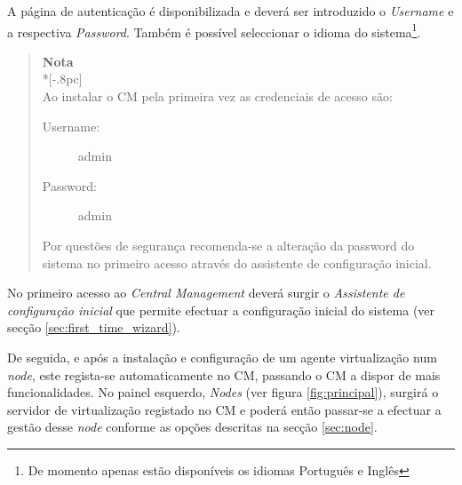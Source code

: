 

A página de autenticação é disponibilizada e deverá ser introduzido o \emph{Username} e a respectiva \emph{Password}. Também é possível seleccionar o idioma do sistema\footnote{De momento apenas estão disponíveis os idiomas Português e Inglês}.

\begin{quote}
	{\large \bf Nota} \\*[-.8pc]
	\underline{\hspace{6in}} \\
	Ao instalar o CM pela primeira vez as credenciais de acesso são:
	\begin{description}
        	\item[Username:] admin
	        \item[Password:] admin
	\end{description}
	Por questões de segurança recomenda-se a alteração da password do sistema no primeiro acesso através do assistente de configuração inicial.

\end{quote}

No primeiro acesso ao \emph{Central Management} deverá surgir o \emph{Assistente de configuração inicial} que permite efectuar a configuração inicial do sistema (ver secção \ref{sec:first_time_wizard}).

De seguida, e após a instalação e configuração de um agente virtualização num \emph{node}, este regista-se automaticamente no CM, passando o CM a dispor de mais funcionalidades.
No painel esquerdo, \emph{Nodes} (ver figura \ref{fig:principal}), surgirá o servidor de virtualização registado no CM e poderá então passar-se a efectuar a gestão desse \emph{node} conforme as opções descritas na secção \ref{sec:node}.

\pagebreak

